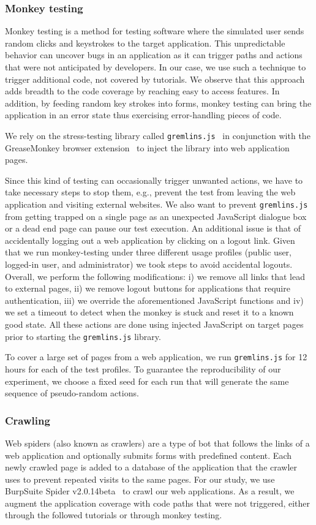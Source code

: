 \subsubsection{Monkey testing}
\label{sec:monkey}
Monkey testing is a method for testing
software where the simulated user sends random clicks and keystrokes to the
target application. This unpredictable behavior can uncover bugs in an
application as it can trigger paths and actions that were not anticipated by
developers. In our case, we use such a technique to trigger additional code,
not covered by tutorials. We observe that this approach adds breadth to the
code coverage by reaching easy to access features. In addition, by feeding
random key strokes into forms, monkey testing can bring the application in an
error state thus exercising error-handling pieces of code.

We rely on the stress-testing library called
\texttt{gremlins.js}~\cite{gremlinsjs} in conjunction with the GreaseMonkey
browser extension~\cite{greasemonkey} to inject the library into web
application pages.

Since this kind of testing can occasionally trigger unwanted actions, we have
to take necessary steps to stop them, e.g., prevent the test from leaving
the web application and visiting external websites. We also want to prevent
\texttt{gremlins.js} from getting trapped on a single page as an unexpected
JavaScript dialogue box or a dead end page can pause our test
execution.
An additional issue is that of accidentally logging out a web application by
clicking on a logout link. Given that we run monkey-testing under three different
usage profiles (public user, logged-in user, and administrator) we took steps
to avoid accidental logouts. Overall, we perform the following
modifications: i) we remove all links that lead to external pages, ii) we
remove logout buttons for applications that require authentication, iii) we
override the aforementioned JavaScript functions and iv) we set a timeout to
detect when the monkey is stuck and reset it to a known good state. All these
actions are done using injected JavaScript on target pages prior to starting
the \texttt{gremlins.js} library.

To cover a large set of pages from a web application, we run
\texttt{gremlins.js} for 12 hours for each of the test profiles.
To guarantee the reproducibility of our experiment, we choose a fixed seed for
each run that will generate the same sequence of pseudo-random actions.


\subsubsection{Crawling}
Web spiders (also known as crawlers) are a type of bot that follows the
links of a web application and optionally submits forms with predefined
content. Each newly crawled page is added to a database of the application that
the crawler uses to prevent repeated visits to the same pages. For our study,
we use BurpSuite Spider v2.0.14beta~\cite{burpsuite} to crawl our web
applications. As a result, we augment the application coverage with code paths that were
not triggered, either through the followed tutorials or through monkey testing.

